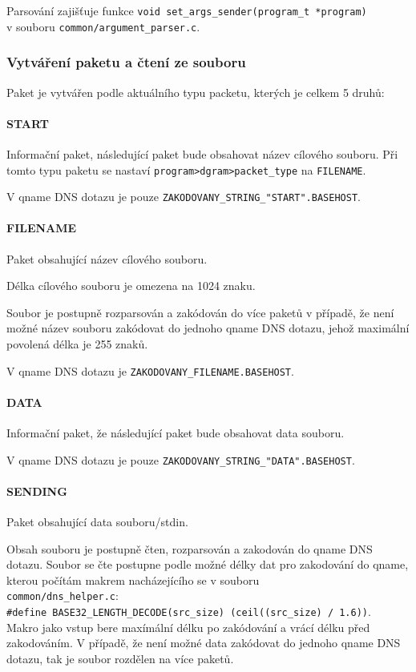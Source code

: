 Parsování zajišťuje funkce \texttt{void set\_args\_sender(program\_t *program)} \\
v souboru \texttt{common/argument\_parser.c}.

\subsubsection{Vytváření paketu a čtení ze souboru} \label{sec:vytvareni-paketu-k}

Paket je vytvářen podle aktuálního typu packetu, kterých je celkem 5 druhů:

\paragraph{START}
Informační paket, následující paket bude obsahovat název cílového souboru.
Při tomto typu paketu se nastaví \texttt{program\->dgram\->packet\_type} na \texttt{FILENAME}.

V qname DNS dotazu je pouze \texttt{ZAKODOVANY\_STRING\_"START".BASEHOST}.

\paragraph{FILENAME}
Paket obsahující název cílového souboru.

Délka cílového souboru je omezena na 1024 znaku.

Soubor je postupně rozparsován a zakódován
do více paketů v případě, že není možné název souboru
zakódovat do jednoho qname DNS dotazu,
jehož maximální povolená délka je 255 znaků\cite{dnsPacketInfo}.

V qname DNS dotazu je \texttt{ZAKODOVANY\_FILENAME.BASEHOST}.

\paragraph{DATA}
Informační paket, že následující paket bude obsahovat data souboru.

V qname DNS dotazu je pouze \texttt{ZAKODOVANY\_STRING\_"DATA".BASEHOST}.

\paragraph{SENDING}
Paket obsahující data souboru/stdin.

Obsah souboru je postupně čten, rozparsován a zakodován do qname DNS dotazu.
Soubor se čte postupne podle možné délky dat pro
zakodování do qname, kterou počítám makrem nacházejícího se v souboru \\
\texttt{common/dns\_helper.c}: \\
\texttt{\#define BASE32\_LENGTH\_DECODE(src\_size) (ceil((src\_size) / 1.6))}. \\
Makro jako vstup bere maxímální délku po zakódování a vrácí délku před zakodováním.
V případě, že není možné data zakódovat do jednoho qname DNS dotazu,
tak je soubor rozdělen na více paketů.

